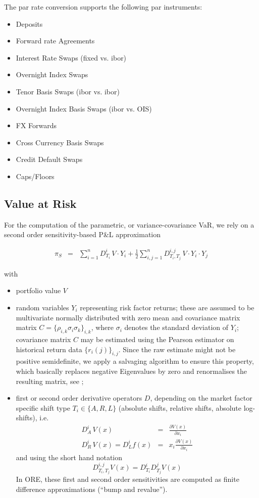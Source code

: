 \documentclass[12pt, a4paper]{article}
\begin{document}
{\begin{appendix}
The par rate conversion supports the following par instruments:
\begin{itemize}
\item Deposits
\item Forward rate Agreements
\item Interest Rate Swaps (fixed vs. ibor)
\item Overnight Index Swaps
\item Tenor Basis Swaps (ibor vs. ibor)
\item Overnight Index Basis Swaps (ibor vs. OIS)
\item FX Forwards
\item Cross Currency Basis Swaps
\item Credit Default Swaps
\item Caps/Floors
\end{itemize}


\subsection{Value at Risk}\label{sec:app_var}

For the computation of the parametric, or variance-covariance VaR, we rely on a second order sensitivity-based P\&L approximation

\begin{eqnarray}\label{taylorPl2}
  \pi_S & = & \sum_{i=1}^n D^i_{T_i}\,V\cdot Y_i 
        + \frac{1}{2} \sum_{i,j=1}^n D^{i,j}_{T_i,T_j}\,V\cdot Y_i\cdot Y_j
\end{eqnarray}

with 
\begin{itemize}
\item portfolio value $V$
\item random variables $Y_i$ representing risk factor returns; these are assumed to be multivariate normally distributed with zero mean
and covariance matrix matrix $C = \{ \rho_{i,k} \sigma_i \sigma_k \}_{i,k}$, where $\sigma_i$ denotes the standard
deviation of $Y_i$; covariance matrix $C$ may be estimated using the Pearson estimator on historical return data
$\{ r_i(j) \}_{i,j}$. Since the raw estimate might not be positive semidefinite, we apply a salvaging algorithm to
ensure this property, which basically replaces negative Eigenvalues by zero and renormalises the resulting matrix, see
\cite{corrSalv};
\item first or second order derivative operators $D$, depending
on the market factor specific shift type $T_i \in \{ A,R,L \}$ (absolute shifts, relative shifts, absolute log-shifts), i.e.
\begin{eqnarray*}\label{derivs}
  D^i_A \,V(x) &=& \frac{\partial V(x)}{\partial x_i} \\
  D^i_R \,V(x) = D^i_L f(x) &=& x_i\frac{\partial V(x)}{\partial x_i}
\end{eqnarray*}
and using the short hand notation
\begin{equation*}
  D^{i,j}_{T_i,T_j} V(x) = D^i_{T_i} D^j_{T_j} V(x)
\end{equation*}
In ORE, these first and second order sensitivities are computed as finite difference
approximations (``bump and revalue'').
\end{itemize}


\end{appendix}}
\end{document}
